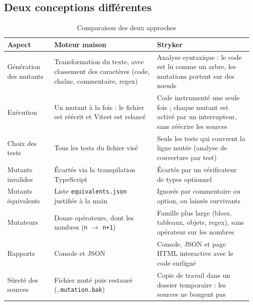 \documentclass[12pt,a4paper]{article}
\begin{document}
\subsection{Deux conceptions différentes}
\begin{table}[H]
\centering
\footnotesize
\begin{tabular}{p{3.2cm}p{5.6cm}p{5.8cm}}
\toprule
\textbf{Aspect} & \textbf{Moteur maison} & \textbf{Stryker} \\
\midrule
Génération des mutants & Transformation du texte, avec classement des caractères (code, chaîne, commentaire, regex) & Analyse syntaxique : le code est lu comme un arbre, les mutations portent sur des n\oe{}uds \\
Exécution & Un mutant à la fois : le fichier est réécrit et Vitest est relancé & Code instrumenté une seule fois ; chaque mutant est activé par un interrupteur, sans réécrire les sources \\
Choix des tests & Tous les tests du fichier visé & Seuls les tests qui couvrent la ligne mutée (analyse de couverture par test) \\
Mutants invalides & Écartés via la transpilation TypeScript & Écartés par un vérificateur de types optionnel \\
Mutants équivalents & Liste \texttt{equivalents.json} justifiée à la main & Ignorés par commentaire ou option, ou laissés survivants \\
Mutateurs & Douze opérateurs, dont les nombres (\texttt{n} $\rightarrow$ \texttt{n+1}) & Famille plus large (blocs, tableaux, objets, regex), sans opérateur sur les nombres \\
Rapports & Console et JSON & Console, JSON et page HTML interactive avec le code surligné \\
Sûreté des sources & Fichier muté puis restauré (\texttt{.mutation.bak}) & Copie de travail dans un dossier temporaire : les sources ne bougent pas \\
\bottomrule
\end{tabular}
\caption{Comparaison des deux approches}
\end{table}
\end{document}
